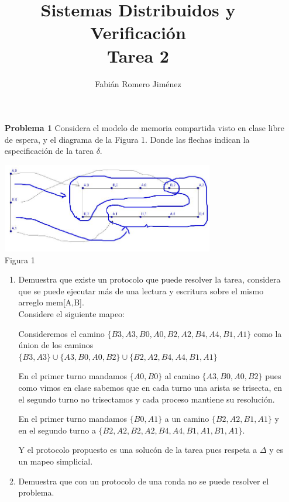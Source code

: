 \documentclass{article}
\title{Sistemas Distribuidos y Verificación \\ Tarea 2}
\author{Fabián Romero Jiménez}
\begin{document}
\maketitle

\begin{enumerate}



\item[\bf{Problema 1}] Considera el modelo de memoria compartida visto en clase libre de espera, y el diagrama de la Figura 1. Donde las flechas indican la especificación de la tarea $\delta$.\\

\begin{center}
  \includegraphics[width=350px]{t2_f1.jpeg}\\
  Figura 1
\end{center}

\begin{enumerate}

\item Demuestra que existe un protocolo que puede resolver la tarea, considera que se puede ejecutar más de una lectura y escritura sobre el mismo arreglo mem[A,B].\\

  Considere el siguiente mapeo:
  
  Consideremos el camino $\{B3,A3,B0,A0,B2,A2,B4,A4,B1,A1\}$ como la únion de los caminos $\{B3,A3\} \cup \{A3,B0,A0,B2\} \cup \{B2,A2,B4,A4,B1,A1\}$
  
  En el primer turno mandamos $\{A0,B0\}$ al camino $\{A3,B0,A0,B2\}$ pues como vimos en clase sabemos que en cada turno una arista se trisecta, en el segundo turno no trisectamos y cada proceso mantiene su resolución.

  En el primer turno mandamos $\{B0,A1\}$ a un camino $\{B2,A2,B1,A1\}$ y en el segundo turno a $\{B2,A2,B2,A2,B4,A4,B1,A1,B1,A1\}$.

 Y el protocolo propuesto es una solucón de la tarea pues respeta a $\Delta$ y es un mapeo simplicial.

\item Demuestra que con un protocolo de una ronda no se puede resolver
el problema.


\end{enumerate}
\end{enumerate}
\end{document}
